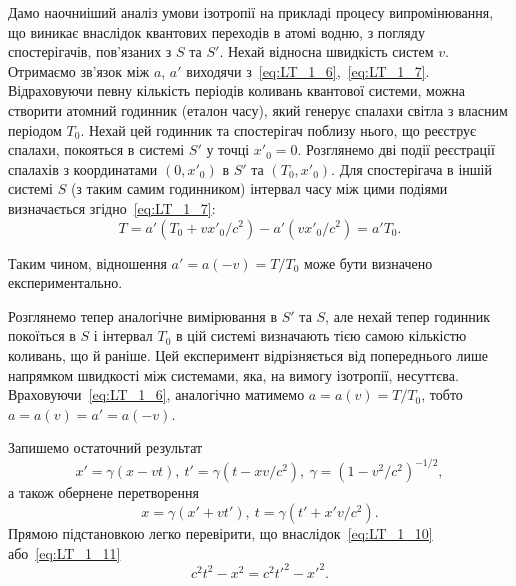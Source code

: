 Дамо наочниіший аналіз умови ізотропії на прикладі процесу випромінювання, що виникає внаслідок квантових переходів в
атомі водню, з погляду спостерігачів, пов'язаних з $S$ та $S'$. Нехай відносна швидкість систем $v$. Отримаємо зв'язок
між $a$, $a'$ виходячи з~\eqref{eq:LT_1_6},~\eqref{eq:LT_1_7}. Відраховуючи певну кількість періодів коливань квантової
системи, можна створити атомний годинник (еталон часу), який генерує спалахи світла з власним періодом $T_0$. Нехай цей
годинник та спостерігач поблизу нього, що реєструє спалахи, покояться в системі $S'$ у точці $x'_0=0$. Розглянемо дві
події реєстрації спалахів з координатами $(0,x'_0)$ в $S'$ та $(T_0,x'_0)$. Для спостерігача в іншій системі $S$ (з
таким самим годинником) інтервал часу між цими подіями визначається згідно~\eqref{eq:LT_1_7}:
\begin{equation*}
    T=a'(T_0+vx'_0/c^2)-a'(vx'_0/c^2)=a'T_0.
\end{equation*}

Таким чином, відношення $a'=a(-v)=T/T_0$ може бути визначено експериментально.

Розглянемо тепер аналогічне вимірювання в $S'$ та $S$, але нехай тепер годинник покоїться в $S$ і інтервал $T_0$ в цій
системі визначають тією самою кількістю коливань, що й раніше. Цей експеримент відрізняється від попереднього лише
напрямком швидкості між системами, яка, на вимогу ізотропії, несуттєва. Враховуючи~\eqref{eq:LT_1_6}, аналогічно
матимемо $a=a(v)=T/T_0$, тобто $a=a(v)=a'=a(-v)$.

Запишемо остаточний результат
\begin{equation}\label{eq:LT_1_10}
	x'=\gamma (x-vt), \ t'=\gamma (t-xv/c^2), \ \gamma =(1-v^2/c^2)^{-1/2},
\end{equation}
а також обернене перетворення
\begin{equation} \label{eq:LT_1_11}
	x=\gamma (x'+vt'), \ t=\gamma (t'+x'v/c^2).
\end{equation}
Прямою підстановкою легко перевірити, що внаслідок~\eqref{eq:LT_1_10} або~\eqref{eq:LT_1_11}
\begin{equation*}
c^2t^2-x^2=c^2t'^2-x'^2.
\end{equation*}


